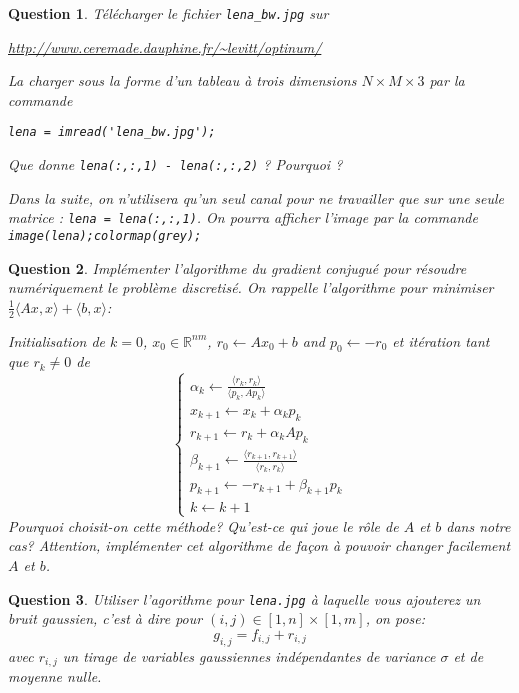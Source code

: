 \documentclass[10pt,a4paper,fleqn]{report}
\newcommand{\dotp}[2]{\langle #1 , #2\rangle}
\newcommand{\R}{\mathbb R}
\newtheorem{question}{Question}
\begin{document}
\begin{question}
  Télécharger le fichier \verb+lena_bw.jpg+ sur

  \url{http://www.ceremade.dauphine.fr/~levitt/optinum/}

  La charger sous la forme d'un tableau à trois dimensions $N \times M
  \times 3$ par la commande

  \verb+lena = imread('lena_bw.jpg');+

  Que donne \verb+lena(:,:,1) - lena(:,:,2)+ ? Pourquoi ?

  Dans la suite, on n'utilisera qu'un seul canal pour ne travailler
  que sur une seule matrice : \verb+lena = lena(:,:,1)+. On pourra
  afficher l'image par la commande \verb+image(lena);colormap(grey);+
\end{question}

\begin{question}
Impl\'ementer l'algorithme du gradient conjugu\'e pour r\'esoudre num\'eriquement le probl\`eme discretis\'e. On rappelle l'algorithme pour minimiser $\frac12 \dotp{Ax}{x}+\dotp{b}{x}$:

Initialisation de $k=0$,
$x_0 \in \R^{nm}$,  $r_0 \leftarrow Ax_0 + b$ and $p_0 \leftarrow -r_0$ et it\'eration tant que $r_k\neq 0$ de
\begin{equation}
\begin{cases}
    \alpha_k \leftarrow \frac{\dotp{r_k}{r_k} }{ \dotp{p_k}{A p_k} } \\
    x_{k+1} \leftarrow x_k + \alpha_k p_k         \\
    r_{k+1} \leftarrow r_k + \alpha_k A p_k       \\
    \beta_{k+1} \leftarrow \frac{ \dotp{r_{k+1}}{r_{k+1}} }{ \dotp{r_k}{r_k} }   \\
    p_{k+1} \leftarrow -r_{k+1} + \beta_{k+1} p_k\\
    k \leftarrow k+1
\end{cases}
\end{equation}
Pourquoi choisit-on cette m\'ethode? Qu'est-ce qui joue le r\^ole de $A$ et $b$ dans notre cas?
Attention, impl\'ementer cet algorithme de fa\c{c}on \`a pouvoir changer facilement $A$ et $b$.
\end{question}

\begin{question}
Utiliser l'agorithme pour \texttt{lena.jpg} \`a laquelle vous ajouterez un bruit gaussien, c'est \`a dire pour $ (i,j)\in [1,n]\times[1,m]$, on pose:
\begin{equation}
g_{i,j} = f_{i,j} + r_{i,j} 
\end{equation}
avec $r_{i,j}$ un tirage de variables gaussiennes ind\'ependantes de variance $\sigma$ et de moyenne nulle.
\end{question}
\end{document}
